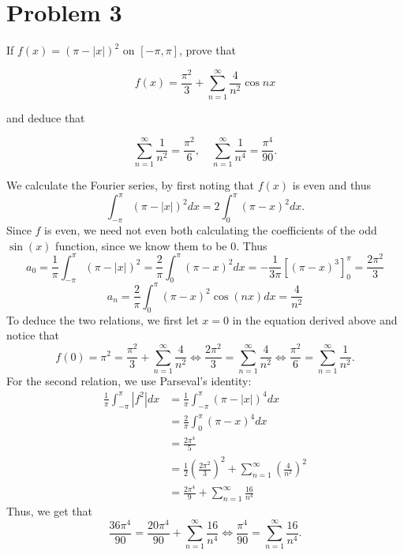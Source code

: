 \documentclass[11pt]{article}
\begin{document}
\section*{Problem 3}
\begin{problem}
    If \( f(x) = (\pi - |x|)^2 \) on \( [-\pi, \pi] \), prove that

\[
f(x) = \frac{\pi^2}{3} + \sum_{n=1}^{\infty} \frac{4}{n^2} \cos nx
\]

and deduce that

\[
\sum_{n=1}^{\infty} \frac{1}{n^2} = \frac{\pi^2}{6}, \quad
\sum_{n=1}^{\infty} \frac{1}{n^4} = \frac{\pi^4}{90}.
\]
\end{problem}
\begin{solution}
    We calculate the Fourier series, by first noting that $f(x)$ is even and thus 
    \[\int_{-\pi}^\pi (\pi - |x|)^2dx = 2\int_{0}^\pi (\pi - x)^2 dx.\] Since $f$ is even, we need not even both calculating the coefficients of the odd $\sin(x)$ function, since we know them to be $0.$ Thus
    \[a_0 = \frac{1}{\pi}\int_{-\pi}^\pi (\pi - |x|)^2 = \frac{2}{\pi}\int_0^\pi (\pi - x)^2dx = -\frac{1}{3\pi}\left[(\pi - x)^3\right]_{0}^\pi =\frac{2\pi^2}{3}\] 
    \[a_n = \frac{2}{\pi}\int_0^\pi(\pi - x)^2 \cos(nx)dx = \frac{4}{n^2}\]
    To deduce the two relations, we first let $x = 0$ in the equation derived above and notice that 
    \[f(0) = \pi^2 = \frac{\pi^2}{3} + \sum_{n=1}^\infty \frac{4}{n^2} \iff \frac{2\pi^2}{3} = \sum_{n=1}^\infty \frac{4}{n^2} \iff \frac{\pi^2}{6} = \sum_{n=1}^\infty \frac{1}{n^2}.\] For the second relation, we use Parseval's identity:
    \begin{align*}
        \frac{1}{\pi}\int_{-\pi}^\pi |f^2|dx &= \frac{1}{\pi}\int_{-\pi}^\pi (\pi - |x|)^4dx\\
        &= \frac{2}{\pi}\int_{0}^\pi (\pi - x)^4dx\\
        &= \frac{2\pi^4}{5}\\
        &= \frac{1}{2}(\frac{2\pi^2}{3})^2 + \sum_{n=1}^\infty(\frac{4}{n^2})^2\\
        &= \frac{2\pi^4}{9} + \sum_{n=1}^\infty\frac{16}{n^4}
    \end{align*}
    Thus, we get that 
    \[\frac{36\pi^4}{90} = \frac{20\pi^4}{90} + \sum_{n=1}^\infty \frac{16}{n^4} \iff \frac{\pi^4}{90} = \sum_{n=1}^\infty \frac{16}{n^4}.\]
    
\end{solution}

\newpage
\end{document}
